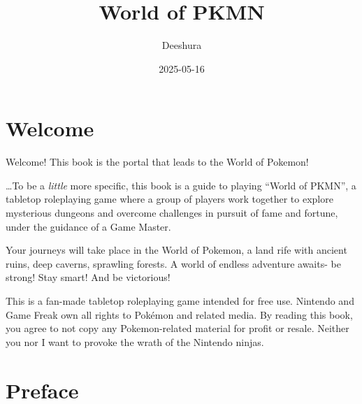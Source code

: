 \documentclass[
  11pt,
  letterpaper,
]{scrbook}
\title{World of PKMN}
\author{Deeshura}
\date{2025-05-16}
\renewcommand*\contentsname{Table of contents}
\newcommand\contentsname{Table of contents}
\begin{document}
\frontmatter
\maketitle

\renewcommand*\contentsname{Table of contents}
{
\setcounter{tocdepth}{2}
\tableofcontents
}

\mainmatter
{}

\chapter*{Welcome}\label{welcome}


Welcome! This book is the portal that leads to the World of Pokemon!

\ldots To be a \emph{little} more specific, this book is a guide to
playing ``World of PKMN'', a tabletop roleplaying game where a group of
players work together to explore mysterious dungeons and overcome
challenges in pursuit of fame and fortune, under the guidance of a Game
Master.

Your journeys will take place in the World of Pokemon, a land rife with
ancient ruins, deep caverns, sprawling forests. A world of endless
adventure awaits- be strong! Stay smart! And be victorious!

\begin{tcolorbox}[enhanced jigsaw, toptitle=1mm, leftrule=.75mm, bottomrule=.15mm, colbacktitle=quarto-callout-important-color!10!white, opacitybacktitle=0.6, toprule=.15mm, colframe=quarto-callout-important-color-frame, breakable, rightrule=.15mm, titlerule=0mm, left=2mm, coltitle=black, title=\textcolor{quarto-callout-important-color}{\faExclamation}\hspace{0.5em}{Disclaimer}, bottomtitle=1mm, opacityback=0, arc=.35mm, colback=white]

This is a fan-made tabletop roleplaying game intended for free use.
Nintendo and Game Freak own all rights to Pokémon and related media. By
reading this book, you agree to not copy any Pokemon-related material
for profit or resale. Neither you nor I want to provoke the wrath of the
Nintendo ninjas.

\end{tcolorbox}


\chapter*{Preface}\label{preface}
\end{document}
